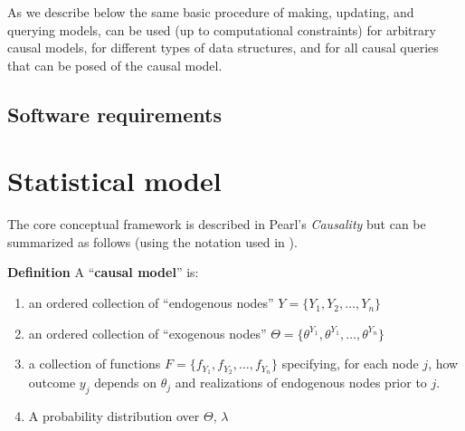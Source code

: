 \documentclass[
  article]{jss}
\providecommand{\tightlist}{%
  \setlength{\itemsep}{0pt}\setlength{\parskip}{0pt}}\usepackage{longtable,booktabs,array}
\begin{document}
As we describe below the same basic procedure of making, updating, and
querying models, can be used (up to computational constraints) for
arbitrary causal models, for different types of data structures, and for
all causal queries that can be posed of the causal model.

\hypertarget{software-requirements}{%
\subsection{Software requirements}\label{software-requirements}}

\hypertarget{statistical-model}{%
\section{Statistical model}\label{statistical-model}}

The core conceptual framework is described in Pearl's \emph{Causality}
\citep{pearl2009causality} but can be summarized as follows (using the
notation used in \citet{ii2023}).

\textbf{Definition} A ``\textbf{causal model}'' is:

\begin{enumerate}
\def\labelenumi{\arabic{enumi}.}
\tightlist
\item
  an ordered collection of ``endogenous nodes''
  \(Y = \{Y_1, Y_2, \dots, Y_n\}\)
\item
  an ordered collection of ``exogenous nodes''
  \(\Theta = \{\theta^{Y_1}, \theta^{Y_1}, \dots, \theta^{Y_n}\}\)
\item
  a collection of functions \(F = \{f_{Y_1}, f_{Y_2}, \dots, f_{Y_n}\}\)
  specifying, for each node \(j\), how outcome \(y_j\) depends on
  \(\theta_j\) and realizations of endogenous nodes prior to \(j\).
\item
  A probability distribution over \(\Theta\), \(\lambda\)
\end{enumerate}
\end{document}
